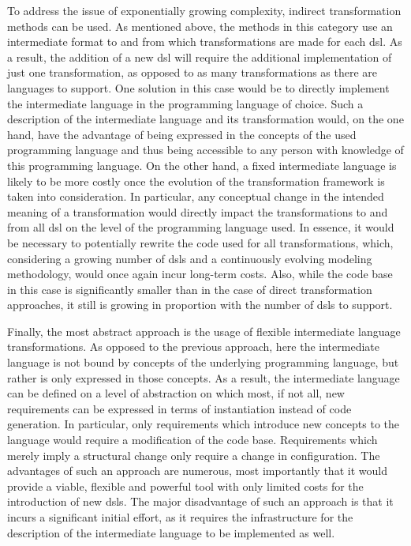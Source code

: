 To address the issue of exponentially growing complexity, indirect transformation methods can be used. As mentioned above, the methods in this category use an intermediate format to and from which transformations are made for each \gls{dsl}. As a result, the addition of a new \gls{dsl} will require the additional implementation of just one transformation, as opposed to as many transformations as there are languages to support. One solution in this case would be to directly implement the intermediate language in the programming language of choice. Such a description of the intermediate language and its transformation would, on the one hand, have the advantage of being expressed in the concepts of the used programming language and thus being accessible to any person with knowledge of this programming language. On the other hand, a fixed intermediate language is likely to be more costly once the evolution of the transformation framework is taken into consideration. In particular, any conceptual change in the intended meaning of a transformation would directly impact the transformations to and from all \gls{dsl} on the level of the programming language used. In essence, it would be necessary to potentially rewrite the code used for all transformations, which, considering a growing number of \glspl{dsl} and a continuously evolving modeling methodology, would once again incur long-term costs. Also, while the code base in this case is significantly smaller than in the case of direct transformation approaches, it still is growing in proportion with the number of \glspl{dsl} to support.

Finally, the most abstract approach is the usage of flexible intermediate language transformations. As opposed to the previous approach, here the intermediate language is not bound by concepts of the underlying programming language, but rather is only expressed in those concepts. As a result, the intermediate language can be defined on a level of abstraction on which most, if not all, new requirements can be expressed in terms of instantiation instead of code generation. In particular, only requirements which introduce new concepts to the language would require a modification of the code base. Requirements which merely imply a structural change only require a change in configuration. The advantages of such an approach are numerous, most importantly that it would provide a viable, flexible and powerful tool with only limited costs for the introduction of new \glspl{dsl}. The major disadvantage of such an approach is that it incurs a significant initial effort, as it requires the infrastructure for the description of the intermediate language to be implemented as well.

